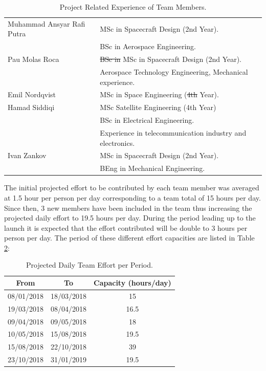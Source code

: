 \documentclass[a4paper,12pt,oneside]{article} %
\providecommand{\DIFaddtex}[1]{{\protect\color{blue}\uwave{#1}}} %
\providecommand{\DIFdeltex}[1]{{\protect\color{red}\sout{#1}}}                      %
\providecommand{\DIFaddFL}[1]{\DIFadd{#1}} %
\providecommand{\DIFdelFL}[1]{\DIFdel{#1}} %
\providecommand{\DIFaddbeginFL}{} %
\providecommand{\DIFaddendFL}{} %
\providecommand{\DIFdelbeginFL}{} %
\providecommand{\DIFdelendFL}{} %
\providecommand{\DIFadd}[1]{\texorpdfstring{\DIFaddtex{#1}}{#1}} %
\providecommand{\DIFdel}[1]{\texorpdfstring{\DIFdeltex{#1}}{}} %
\newcommand{\DIFscaledelfig}{0.5}
\newlength{\DIFdelgraphicswidth} %
\newlength{\DIFdelgraphicsheight} %
\newcommand{\DIFaddincludegraphics}[2][]{{\color{blue}\fbox{\DIFOincludegraphics[#1]{#2}}}} %
\newcommand{\DIFdelincludegraphics}[2][]{%
\sbox{\DIFdelgraphicsbox}{\DIFOincludegraphics[#1]{#2}}%
\settoboxwidth{\DIFdelgraphicswidth}{\DIFdelgraphicsbox} %
\settoboxtotalheight{\DIFdelgraphicsheight}{\DIFdelgraphicsbox} %
\scalebox{\DIFscaledelfig}{%
\parbox[b]{\DIFdelgraphicswidth}{\usebox{\DIFdelgraphicsbox}\\[-\baselineskip] \rule{\DIFdelgraphicswidth}{0em}}\llap{\resizebox{\DIFdelgraphicswidth}{\DIFdelgraphicsheight}{%
\setlength{\unitlength}{\DIFdelgraphicswidth}%
\begin{picture}(1,1)%
\thicklines\linethickness{2pt} %
{\color[rgb]{1,0,0}\put(0,0){\framebox(1,1){}}}%
{\color[rgb]{1,0,0}\put(0,0){\line( 1,1){1}}}%
{\color[rgb]{1,0,0}\put(0,1){\line(1,-1){1}}}%
\end{picture}%
}\hspace*{3pt}}} %
} %
\DeclareRobustCommand{\DIFaddbeginFL}{\DIFOaddbeginFL \let\includegraphics\DIFaddincludegraphics} %
\DeclareRobustCommand{\DIFaddendFL}{\DIFOaddendFL \let\includegraphics\DIFOincludegraphics} %
\DeclareRobustCommand{\DIFdelbeginFL}{\DIFOdelbeginFL \let\includegraphics\DIFdelincludegraphics} %
\DeclareRobustCommand{\DIFdelendFL}{\DIFOaddendFL \let\includegraphics\DIFOincludegraphics} %
\begin{document}
\begin{table}[H]
\begin{tabular}{|l|m{11cm}|}
\DIFdelendFL \hline
Muhammad Ansyar Rafi Putra & MSc in Spacecraft Design (2nd Year). \\& BSc in Aerospace Engineering. \\ \hline
Pau Molas Roca & \DIFdelbeginFL \DIFdelFL{BSc in }\DIFdelendFL MSc in Spacecraft Design (2nd Year). \\& \DIFaddbeginFL \DIFaddFL{BSc in }\DIFaddendFL Aerospace Technology Engineering, Mechanical experience. \\ \hline
Emil Nordqvist & MSc in Space Engineering (\DIFdelbeginFL \DIFdelFL{4th }\DIFdelendFL \DIFaddbeginFL \DIFaddFL{5th }\DIFaddendFL Year). \\ \hline
Hamad Siddiqi & MSc Satellite Engineering (4th Year) \\&  BSc in Electrical Engineering.\\& Experience in telecommunication industry and electronics.  \\ \hline
Ivan Zankov & MSc in Spacecraft Design (2nd Year). \\& BEng in Mechanical Engineering.\\ \hline
\end{tabular}
\caption{Project Related Experience of Team Members.}
\label{tab:team-member-experience}
\end{table}
\raggedbottom

The initial projected effort to be contributed by each team member was averaged at 1.5 hour per person per day corresponding to a team total of 15 hours per day. Since then, 3 new members have been included in the team thus increasing the projected daily effort to 19.5 hours per day. During the period leading up to the launch it is expected that the effort contributed will be double to 3 hours per person per day. The period of these different effort capacities are listed in Table \ref{tab:daily-team-effort-per-period}:

\begin{table}[H]
\centering
\begin{tabular}{|c|c|c|}
\hline
\textbf{From} & \textbf{To} & \textbf{Capacity (hours/day)} \\ \hline
08/01/2018 & 18/03/2018 & 15 \\ \hline
19/03/2018 & 08/04/2018 & 16.5 \\ \hline
09/04/2018 & 09/05/2018 & 18 \\ \hline
10/05/2018 & 15/08/2018 & 19.5 \\ \hline
15/08/2018 & 22/10/2018 & 39 \\ \hline
23/10/2018 & 31/01/2019 & 19.5 \\ \hline
\end{tabular}
\caption{Projected Daily Team Effort per Period.}
\label{tab:daily-team-effort-per-period}
\end{table}
\end{document}

